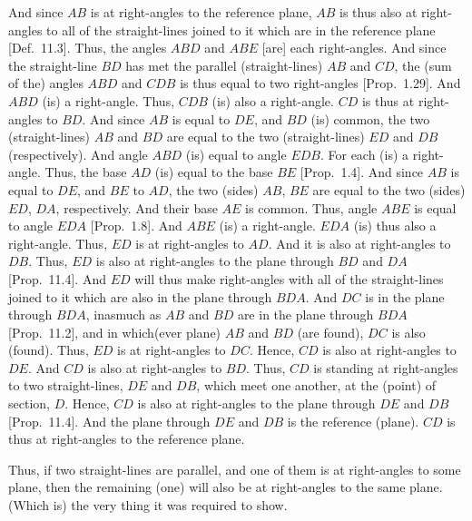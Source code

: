 \begin{Parallel}{}{}
{And since $AB$ is at right-angles to the reference plane, $AB$ is thus also
at right-angles to all of the straight-lines joined to it which are in the
reference plane [Def.~11.3].  Thus, the angles $ABD$ and $ABE$ [are] each right-angles. And since the straight-line $BD$ has
met the parallel (straight-lines) $AB$ and $CD$, the (sum of the) angles
$ABD$ and $CDB$ is thus equal to two right-angles [Prop.~1.29]. And $ABD$ (is) a right-angle. Thus, $CDB$ (is)
also a right-angle. $CD$ is thus at right-angles to $BD$. And since $AB$
is equal to $DE$, and $BD$ (is) common, the two (straight-lines) $AB$ and
$BD$ are equal to the two (straight-lines) $ED$ and $DB$ (respectively). And angle
$ABD$ (is) equal to angle $EDB$. For each (is) a right-angle.
Thus, the base $AD$ (is) equal to the base $BE$ [Prop.~1.4]. And since $AB$ is equal to $DE$, and $BE$ to $AD$, 
the two (sides) $AB$, $BE$ are equal to the two (sides) $ED$, $DA$,
respectively. And their base $AE$ is common. Thus, angle $ABE$ is equal to
angle $EDA$ [Prop.~1.8]. And $ABE$ (is) a
right-angle. $EDA$ (is) thus also a right-angle. Thus, $ED$ is
at right-angles to $AD$. And it is also at right-angles to $DB$. Thus, $ED$
is also at right-angles to the plane through $BD$ and $DA$ [Prop.~11.4]. And $ED$ will thus  make right-angles
with all of the straight-lines joined to it which are also in the plane through
$BDA$. And $DC$ is in the plane through $BDA$, inasmuch as
$AB$ and $BD$ are in the plane through $BDA$ [Prop.~11.2], and in which(ever plane)
$AB$ and $BD$ (are found), $DC$ is also (found). Thus, $ED$ is at right-angles to $DC$. Hence, $CD$ is also at right-angles to $DE$. And
$CD$ is also at right-angles to $BD$. Thus, $CD$ is standing  at right-angles
to two straight-lines, $DE$ and $DB$, which meet one another, at the 
(point) of section, $D$. Hence, $CD$ is also at
right-angles to the plane through $DE$ and $DB$ [Prop.~11.4]. And the plane through $DE$ and $DB$ is the reference
(plane). $CD$ is thus at right-angles to the reference plane.

Thus, if  two  straight-lines are parallel, and one of them is at right-angles to some plane, then the remaining (one) will also
be at right-angles to the same plane. (Which is) the very thing it was required to show.}
\end{Parallel}

